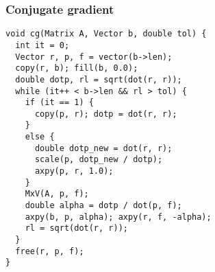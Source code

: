 \begin{frame}[fragile]
  \frametitle{Conjugate gradient}
\begin{lstlisting}[style=c, basicstyle=\ttfamily\scriptsize]
void cg(Matrix A, Vector b, double tol) {
  int it = 0;
  Vector r, p, f = vector(b->len);
  copy(r, b); fill(b, 0.0);
  double dotp, rl = sqrt(dot(r, r));
  while (it++ < b->len && rl > tol) {
    if (it == 1) {
      copy(p, r); dotp = dot(r, r);
    }
    else {
      double dotp_new = dot(r, r);
      scale(p, dotp_new / dotp);
      axpy(p, r, 1.0);
    }
    MxV(A, p, f);
    double alpha = dotp / dot(p, f);
    axpy(b, p, alpha); axpy(r, f, -alpha);
    rl = sqrt(dot(r, r));
  }
  free(r, p, f);
}
\end{lstlisting}
\end{frame}


